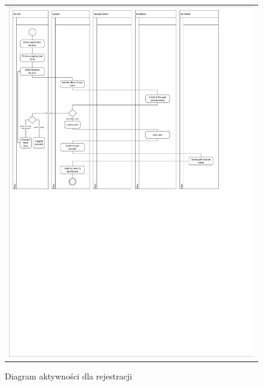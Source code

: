\documentclass{sprawozdanie-agh}
\begin{document}
			\begin{figure}[H]
				\centering
				\begin{tabular}{c}
					\includegraphics[width=.95\textwidth]{cropped_Registration_Activity_Diagram} 
				\end{tabular}
			\caption{Diagram aktywności dla rejestracji}
			\end{figure}
\end{document}
